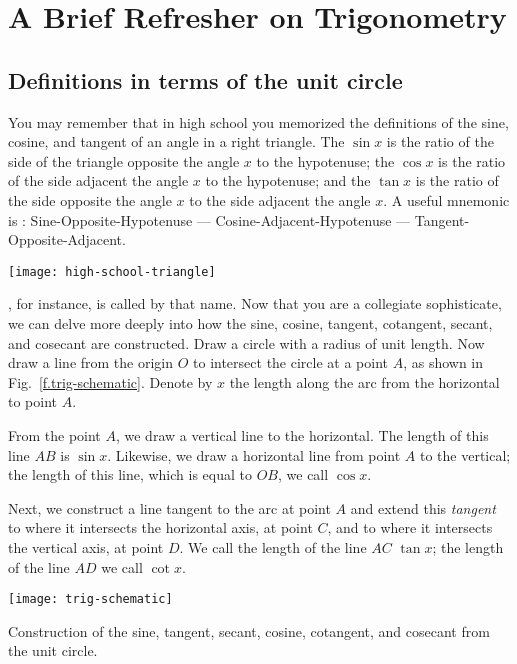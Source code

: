 \section{A Brief Refresher on Trigonometry}

\subsection{Definitions in terms of the unit circle}

You may remember that in high school you memorized the definitions of the sine, cosine, and tangent of an angle in a right triangle.  The $\sin x$ is the ratio of the side of the triangle opposite the angle $x$ to the hypotenuse; the $\cos x$ is the ratio of the side adjacent the angle $x$ to the hypotenuse; and the $\tan x$ is the ratio of the side opposite the angle $x$ to the side adjacent the angle $x$. A useful mnemonic is : Sine-Opposite-Hypotenuse --- Cosine-Adjacent-Hypotenuse --- Tangent-Opposite-Adjacent.

\begin{marginfigure}
\texttt{[image: high-school-triangle]}
\label{f.high-school-triangle}
\end{marginfigure}

, for instance, is called by that name.  Now that you are a  collegiate sophisticate, we can delve more deeply into how the sine, cosine, tangent, cotangent, secant, and cosecant are constructed.
Draw a circle with a radius of unit length.  Now draw a line from the origin $O$ to intersect the circle at a point $A$, as shown in Fig.~\ref{f.trig-schematic}.  Denote by $x$ the length along the arc from the horizontal to point $A$.

From the point $A$, we draw a vertical line to the horizontal.  The length of this line $AB$ is $\sin x$. Likewise, we draw a horizontal line from point $A$ to the vertical; the length of this line, which is equal to $OB$, we call $\cos x$.  

Next, we construct a line tangent to the arc at point $A$ and extend this \emph{tangent} to where it intersects the horizontal axis, at point $C$, and to where it intersects the vertical axis, at point $D$.  We call the length of the line $AC$ $\tan x$; the length of the line $AD$ we call $\cot x$.

\begin{marginfigure}[-4\baselineskip]
\texttt{[image: trig-schematic]}
\caption[Construction from the unit circle]{Construction of the sine, tangent, secant, cosine, cotangent, and cosecant from the unit circle.}
\label{f.trig-schematic}
\end{marginfigure}

